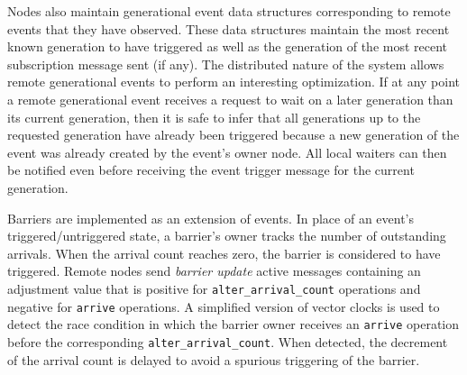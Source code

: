 Nodes also maintain generational event data structures corresponding to remote events that they have
observed.  These data structures maintain the most recent known generation to have triggered as well
as the generation of the most recent subscription message sent (if any).  The distributed nature
of the system allows remote generational events to perform an interesting optimization.  If at any point a
remote generational event receives a request to wait on a later generation than its current
generation,
then it is safe to infer that all generations up to the requested generation have already 
been triggered because a new generation of the event was already created by the event's owner node.
All local waiters can then be notified even before receiving the event trigger message for the current generation.

Barriers are implemented as an extension of events.  In place of an event's triggered/untriggered state,
a barrier's owner tracks the number of outstanding arrivals.  When the arrival count 
reaches zero, the barrier is considered to have triggered.  Remote nodes send {\em barrier update}
active messages containing an adjustment value that is positive for {\tt alter\_arrival\_count} operations 
and negative for {\tt arrive} operations.  A simplified version of vector clocks\cite{Fidge1998} is used
to detect the race condition in which the barrier owner receives an {\tt arrive} operation before the
corresponding {\tt alter\_arrival\_count}.  When detected, the decrement of the arrival count 
is delayed to avoid a spurious triggering of the barrier.

